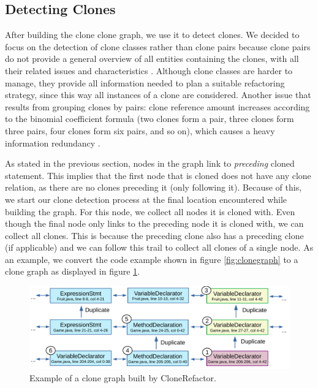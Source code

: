 \subsection{Detecting Clones} \label{sec:detectingclones}
After building the clone clone graph, we use it to detect clones. We decided to focus on the detection of clone classes rather than clone pairs because clone pairs do not provide a general overview of all entities containing the clones, with all their related issues and characteristics \cite{fontana2012duplicated}. Although clone classes are harder to manage, they provide all information needed to plan a suitable refactoring strategy, since this way all instances of a clone are considered. Another issue that results from grouping clones by pairs: clone reference amount increases according to the binomial coefficient formula (two clones form a pair, three clones form three pairs, four clones form six pairs, and so on), which causes a heavy information redundancy \cite{fontana2012duplicated}.

As stated in the previous section, nodes in the graph link to \textit{preceding} cloned statement. This implies that the first node that is cloned does not have any clone relation, as there are no clones preceding it (only following it). Because of this, we start our clone detection process at the final location encountered while building the graph. For this node, we collect all nodes it is cloned with. Even though the final node only links to the preceding node it is cloned with, we can collect all clones. This is because the preceding clone also has a preceding clone (if applicable) and we can follow this trail to collect all clones of a single node. As an example, we convert the code example shown in figure \ref{fig:clonegraph} to a clone graph as displayed in figure \ref{fig:clonegraph2}.

\begin{figure}[H]
  \centering
  \includegraphics[width=1\columnwidth]{img/CodeGraphExample}
  \caption{Example of a clone graph built by CloneRefactor.}
  \label{fig:clonegraph2}
\end{figure}

